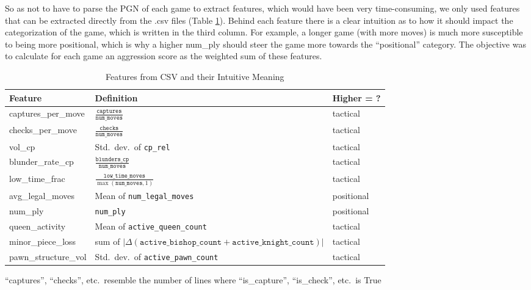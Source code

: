 So as not to have to parse the PGN of each game to extract features, which would have been very time-consuming, we only used features that can be extracted directly from the .csv files (Table \ref{tab:feature_table}).
Behind each feature there is a clear intuition as to how it should impact the categorization of the game, which is written in the third column.
For example, a longer game (with more moves) is much more susceptible to being more positional, which is why a higher num\_ply should steer the game more towards the ``positional'' category.
The objective was to calculate for each game an aggression score as the weighted sum of these features.

\begin{table}[H]
\centering
\begin{threeparttable}
\caption{Features from CSV and their Intuitive Meaning}
\label{tab:feature_table}
\begin{tabular}{lll}
\toprule
\textbf{Feature} & \textbf{Definition} & \textbf{Higher = ?} \\
\midrule
captures\_per\_move & $\frac{\texttt{captures}}{\texttt{num\_moves}}$ & tactical\\
checks\_per\_move & $\frac{\texttt{checks}}{\texttt{num\_moves}}$ & tactical\\
vol\_cp & Std.\ dev.\ of \texttt{cp\_rel} & tactical\\
blunder\_rate\_cp & $\frac{\texttt{blunders\_cp}}{\texttt{num\_moves}}$ & tactical\\
low\_time\_frac & $\frac{\texttt{low\_time\_moves}}{\max(\texttt{num\_moves},1)}$ & tactical\\
avg\_legal\_moves & Mean of \texttt{num\_legal\_moves} & positional\\
num\_ply & \texttt{num\_ply} & positional\\
queen\_activity & Mean of \texttt{active\_queen\_count} & tactical \\
minor\_piece\_loss & sum of $|\Delta(\texttt{active\_bishop\_count} + \texttt{active\_knight\_count})|$ & tactical\\
pawn\_structure\_vol & Std.\ dev.\ of \texttt{active\_pawn\_count} & tactical\\
\bottomrule
\end{tabular}
\begin{tablenotes}
\small
\item ``captures'', ``checks'', etc.\ resemble the number of lines where ``is\_capture'', ``is\_check'', etc.\ is True
\end{tablenotes}
\end{threeparttable}
\end{table}

